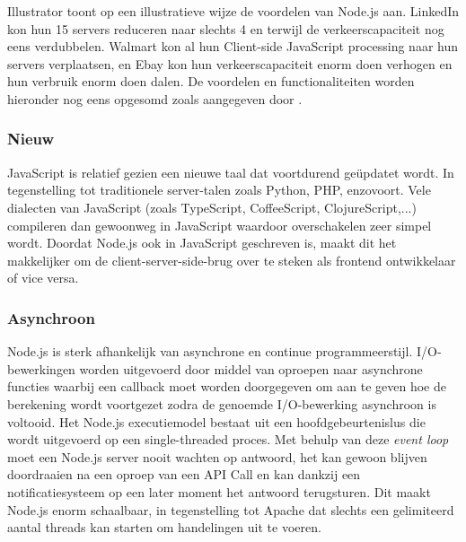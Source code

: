 Illustrator \textcite{Mehmet2016} toont op een illustratieve wijze de voordelen van Node.js aan. LinkedIn kon hun 15 servers reduceren naar slechts 4 en terwijl de verkeerscapaciteit nog eens verdubbelen. Walmart kon al hun Client-side JavaScript processing naar hun servers verplaatsen, en Ebay kon hun verkeerscapaciteit enorm doen verhogen en hun verbruik enorm doen dalen. De voordelen en functionaliteiten worden hieronder nog eens opgesomd zoals aangegeven door \textcite{Chandrayan2017}.

\subsubsection{Nieuw}
\label{sec:new}

JavaScript is relatief gezien een nieuwe taal dat voortdurend geüpdatet wordt. In tegenstelling tot traditionele server-talen zoals Python, PHP, enzovoort. Vele dialecten van JavaScript (zoals TypeScript, CoffeeScript, ClojureScript,...) compileren dan gewoonweg in JavaScript waardoor overschakelen zeer simpel wordt. Doordat Node.js ook in JavaScript geschreven is, maakt dit het makkelijker om de client-server-side-brug over te steken als frontend ontwikkelaar of vice versa. \autocite{ExpressMozilla}

\subsubsection{Asynchroon}
\label{sec:async}

Node.js is sterk afhankelijk van asynchrone en continue programmeerstijl. I/O-bewerkingen worden uitgevoerd door middel van oproepen naar asynchrone functies waarbij een callback moet worden doorgegeven om aan te geven hoe de berekening wordt voortgezet zodra de genoemde I/O-bewerking asynchroon is voltooid. Het Node.js executiemodel bestaat uit een hoofdgebeurtenislus die wordt uitgevoerd op een single-threaded proces. Met behulp van deze \textit{event loop} moet een Node.js server nooit wachten op antwoord, het kan gewoon blijven doordraaien na een oproep van een API Call en kan dankzij een notificatiesysteem op een later moment het antwoord terugsturen. Dit maakt Node.js enorm schaalbaar, in tegenstelling tot Apache dat slechts een gelimiteerd aantal threads kan starten om handelingen uit te voeren.

